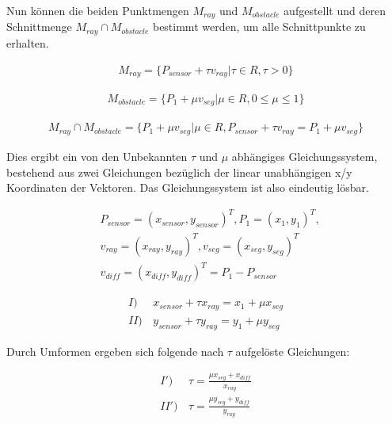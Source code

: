 Nun können die beiden Punktmengen $M_{ray}$ und $M_{obstacle}$ aufgestellt und deren
Schnittmenge $M_{ray} \cap M_{obstacle}$ bestimmt werden, um alle Schnittpunkte zu erhalten.

\begin{equation}
\begin{aligned}
M_{ray} = \{ P_{sensor} + \tau v_{ray} | \tau \in R, \tau > 0 \}
\end{aligned}
\end{equation}

\begin{equation}
\begin{aligned}
M_{obstacle} = \{ P_1 + \mu v_{seg} | \mu \in R, 0 \le \mu \le 1 \}
\end{aligned}
\end{equation}

\begin{equation}
\begin{aligned}
M_{ray} \cap M_{obstacle} =
\{ P_1 + \mu v_{seg} | \mu \in R, P_{sensor} + \tau v_{ray} = P_1 + \mu v_{seg} \}
\end{aligned}
\end{equation}

Dies ergibt ein von den Unbekannten $\tau$ und $\mu$ abhängiges Gleichungssystem,
bestehend aus zwei Gleichungen bezüglich der linear unabhängigen x/y Koordinaten
der Vektoren. Das Gleichungssystem ist also eindeutig lösbar.

\begin{equation}
\begin{aligned}
&P_{sensor} = (x_{sensor}, y_{sensor})^T, P_1 = (x_1, y_1)^T,\\
&v_{ray} = (x_{ray}, y_{ray})^T, v_{seg} = (x_{seg}, y_{seg})^T\\
&v_{diff} = (x_{diff}, y_{diff})^T = P_1 - P_{sensor}
\end{aligned}
\end{equation}

\begin{equation}
\begin{aligned}
I)& \, x_{sensor} + \tau x_{ray} = x_1 + \mu x_{seg}\\
II)& \, y_{sensor} + \tau y_{ray} = y_1 + \mu y_{seg}
\end{aligned}
\end{equation}

Durch Umformen ergeben sich folgende nach $\tau$ aufgelöste Gleichungen:

\begin{equation}
\begin{aligned}
I')& \, \tau = \frac{\mu x_{seg} + x_{diff}}{x_{ray}}\\
II')& \, \tau = \frac{\mu y_{seg} + y_{diff}}{y_{ray}}
\end{aligned}
\end{equation}

